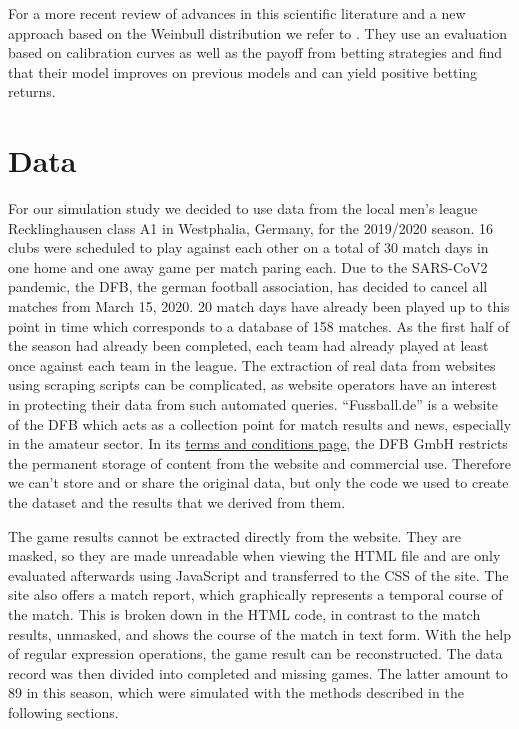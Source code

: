 \documentclass[12pt,a4paper]{article}
\begin{document}
For a more recent review of advances in this scientific literature and a
new approach based on the Weinbull distribution we refer to
\textcite{boshnakov2017}. They use an evaluation based on calibration
curves as well as the payoff from betting strategies and find that their
model improves on previous models and can yield positive betting
returns.

\hypertarget{data}{%
\section{Data}\label{data}}

For our simulation study we decided to use data from the local men's
league Recklinghausen class A1 in Westphalia, Germany, for the 2019/2020
season. 16 clubs were scheduled to play against each other on a total of
30 match days in one home and one away game per match paring each. Due
to the SARS-CoV2 pandemic, the DFB, the german football association, has
decided to cancel all matches from March 15, 2020. 20 match days have
already been played up to this point in time which corresponds to a
database of 158 matches. As the first half of the season had already
been completed, each team had already played at least once against each
team in the league. The extraction of real data from websites using
scraping scripts can be complicated, as website operators have an
interest in protecting their data from such automated queries.
\enquote{Fussball.de} is a website of the DFB which acts as a collection
point for match results and news, especially in the amateur sector. In
its \href{http://www.fussball.de/terms.and.conditions\#!/}{terms and
conditions page}, the DFB GmbH restricts the permanent storage of
content from the website and commercial use. Therefore we can't store
and or share the original data, but only the code we used to create the
dataset and the results that we derived from them.

The game results cannot be extracted directly from the website. They are
masked, so they are made unreadable when viewing the HTML file and are
only evaluated afterwards using JavaScript and transferred to the CSS of
the site. The site also offers a match report, which graphically
represents a temporal course of the match. This is broken down in the
HTML code, in contrast to the match results, unmasked, and shows the
course of the match in text form. With the help of regular expression
operations, the game result can be reconstructed. The data record was
then divided into completed and missing games. The latter amount to 89
in this season, which were simulated with the methods described in the
following sections.
\end{document}
